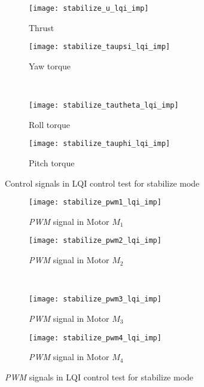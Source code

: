 \begin{appendices}
\begin{figure}[H]
\begin{subfigure}{0.5\linewidth}
\centering
\texttt{[image: stabilize\_u\_lqi\_imp]}
\caption{Thrust}
\label{fig:stabilize_u_lqi_imp}
\end{subfigure}%
\begin{subfigure}{0.5\linewidth}
\centering
\texttt{[image: stabilize\_taupsi\_lqi\_imp]}
\caption{Yaw torque}
\label{fig:stabilize_taupsi_lqi_imp}
\end{subfigure}\\[1ex]
\begin{subfigure}{0.5\linewidth}
\centering
\texttt{[image: stabilize\_tautheta\_lqi\_imp]}
\caption{Roll torque}
\label{fig:stabilize_tautheta_lqi_imp}
\end{subfigure}
\begin{subfigure}{0.5\linewidth}
\centering
\texttt{[image: stabilize\_tauphi\_lqi\_imp]}
\caption{Pitch torque}
\label{fig:stabilize_tauphi_lqi_imp}
\end{subfigure}
\caption{Control signals in LQI control test for stabilize mode}
\label{fig:stabilize_control_lqi}
\end{figure}

\begin{figure}[H]
\begin{subfigure}{.5\linewidth}
\centering
\texttt{[image: stabilize\_pwm1\_lqi\_imp]}
\caption{\textit{PWM} signal in Motor $M_1$}
\label{fig:stabilize_pwm_lqi_imp}
\end{subfigure}%
\begin{subfigure}{.5\linewidth}
\centering
\texttt{[image: stabilize\_pwm2\_lqi\_imp]}
\caption{\textit{PWM} signal in Motor $M_2$}
\label{fig:stabilize_pwm2_lqi_imp}
\end{subfigure}\\[1ex]
\begin{subfigure}{0.5\linewidth}
\centering
\texttt{[image: stabilize\_pwm3\_lqi\_imp]}
\caption{\textit{PWM} signal in Motor $M_3$}
\label{fig:stabilize_pwm3_lqi_imp}
\end{subfigure}
\begin{subfigure}{0.5\linewidth}
\centering
\texttt{[image: stabilize\_pwm4\_lqi\_imp]}
\caption{\textit{PWM} signal in Motor $M_4$}
\label{fig:stabilize_pwm4_lqi_imp}
\end{subfigure}
\caption{\textit{PWM} signals in LQI control test for stabilize mode}
\label{fig:stabilize_pwm_lqi}
\end{figure}


\end{appendices}
